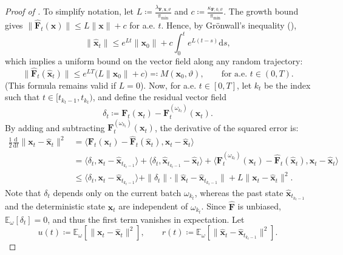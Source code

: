 \documentclass[twoside,11pt]{article}
\theoremstyle{plain}
\def\E{\mathbb E}
\newcommand{\diff}{\mathrm{d}}
\newcommand{\bfF}{\mathbf{F}}
\newcommand{\bfx}{\mathbf{x}}
\begin{document}
\begin{proof}[Proof of ]
 To simplify notation, let $L\coloneqq\frac{\lambda_{\bfF,\bfx,\vartheta}}{\pi_{\min}}$ and $c\coloneqq\frac{\kappa_{\bfF,0,\vartheta}}{\pi_{\min}}.$ The growth bound gives $\|\hat{\bfF}_t(\bfx)\|\le L\|\bfx\|+c$ for a.e. $t$. Hence, by Grönwall's inequality (),
\begin{equation*}
\|\hat{\bfx}_t\| \le e^{Lt}\|\bfx_0\| + c\int_0^t e^{L(t-s)}\diff s,
\end{equation*}
which implies a uniform bound on the vector field along any random trajectory:
\begin{equation}\label{eq:thm1lastbound2}
\|\hat{\bfF}_t(\hat{\bfx}_t)\| \le e^{LT}\bigl(L\|\bfx_0\|+c\bigr) \eqqcolon M(\bfx_0,\vartheta), \qquad \text{for a.e. } t\in(0,T).
\end{equation}
(This formula remains valid if $L=0$). Now, for a.e. $t\in[0,T]$, let $k_t$ be the index such that $t\in[t_{k_t-1},t_{k_t})$, and define the residual vector field
\begin{equation*}
\delta_t \coloneqq \bfF_t(\bfx_t)-\bfF^{(\omega_{k_t})}_t(\bfx_t).
\end{equation*}
By adding and subtracting $\bfF^{(\omega_{k_t})}_t(\bfx_t)$, the derivative of the squared error is:
\begin{align*}
\frac12\frac{\diff}{\diff t}\|\bfx_t-\hat{\bfx}_t\|^2 &= \langle \bfF_t(\bfx_t)-\hat{\bfF}_t(\hat{\bfx}_t), \bfx_t-\hat{\bfx}_t \rangle \\
&= \langle \delta_t,\bfx_t-\hat{\bfx}_{t_{k_t-1}}\rangle + \langle\delta_t,\hat{\bfx}_{t_{k_t-1}}-\hat{\bfx}_t\rangle + \langle\bfF^{(\omega_{k_t})}_t(\bfx_t)-\hat{\bfF}_t(\hat{\bfx}_t), \bfx_t-\hat{\bfx}_t\rangle \\
&\le \langle\delta_t,\bfx_t-\hat{\bfx}_{t_{k_t-1}}\rangle + \|\delta_t\|\cdot\|\hat{\bfx}_t-\hat{\bfx}_{t_{k_t-1}}\| + L\|\bfx_t-\hat{\bfx}_t\|^2.
\end{align*}
Note that $\delta_t$ depends only on the current batch $\omega_{k_t}$, whereas the past state $\hat{\bfx}_{t_{k_t-1}}$ and the deterministic state $\bfx_t$ are independent of $\omega_{k_t}$. Since $\hat{\bfF}$ is unbiased, $\E_\omega[\delta_t]=0$, and thus the first term vanishes in expectation. Let
\begin{equation*}
u(t)\coloneqq \E_\omega\left[\|\bfx_t-\hat{\bfx}_t\|^2\right], \qquad r(t)\coloneqq \E_\omega\left[\|\hat{\bfx}_t-\hat{\bfx}_{t_{k_t-1}}\|^2\right].
\end{equation*}

\end{proof}
\end{document}
